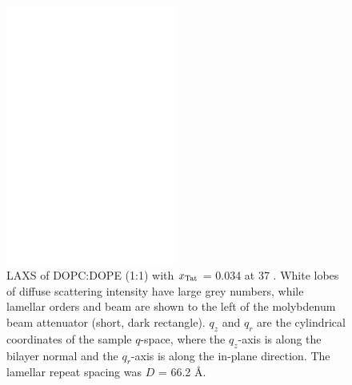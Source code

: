 \begin{figure}[htbp]
  \centering
  \includegraphics[width=0.5\textwidth]{figures/Tat/NFIT_results/dopcdope1to1}
  \caption[LAXS of DOPC:DOPE (1:1) with $\xTat$ = 0.034 at 37 \textcelsius]
  {LAXS of DOPC:DOPE (1:1) with $\xTat$ = 0.034 at 37 \textcelsius. 
  White lobes of diffuse scattering intensity have large grey numbers, while
  lamellar orders and beam are shown to the left of the
  molybdenum beam attenuator (short, dark rectangle). $q_z$ and $q_r$ are the 
  cylindrical coordinates of the sample $q$-space, where the $q_z$-axis is along 
  the bilayer normal and the $q_r$-axis is along the in-plane direction. 
  The lamellar repeat spacing was $D$ = 66.2 \AA.}
  \label{fig:figure1}
\end{figure}

